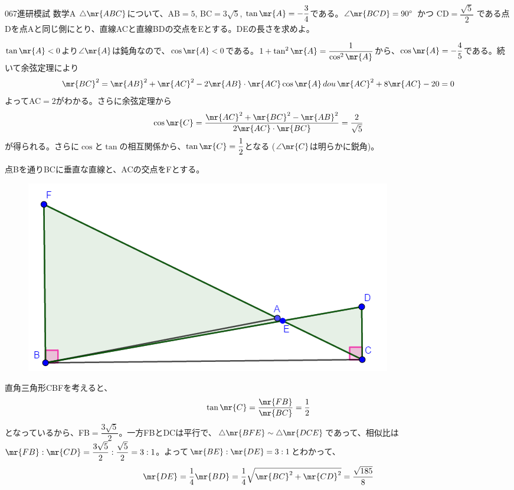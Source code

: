\begin{thm}{067}{}{進研模試 数学A}
 $\triangle\mr{ABC}$について、AB$=5$, BC$=3\sqrt{5}$, $\tan\mr{A}=-\dfrac{3}{4}$である。$\angle\mr{BCD}=90^\circ$ かつ CD$=\dfrac{\sqrt{5}}{2}$ である点Dを点Aと同じ側にとり、直線ACと直線BDの交点をEとする。DEの長さを求めよ。
\end{thm}

$\tan\mr{A}<0$より$\angle\mr{A}$は鈍角なので、$\cos\mr{A}<0$である。$1+\tan^2\mr{A}=\dfrac{1}{\cos^2\mr{A}}$から、$\cos\mr{A}=-\dfrac{4}{5}$である。続いて余弦定理により
\[ \mr{BC}^2=\mr{AB}^2+\mr{AC}^2-2\mr{AB}\cdot\mr{AC}\cos\mr{A} \,dou\, \mr{AC}^2+8\mr{AC}-20=0 \]
よってAC$=2$がわかる。さらに余弦定理から
\[ \cos\mr{C}=\frac{\mr{AC}^2+\mr{BC}^2-\mr{AB}^2}{2\mr{AC}\cdot\mr{BC}} = \frac{2}{\sqrt{5}} \]
が得られる。さらに$\cos$と$\tan$の相互関係から、$\tan\mr{C}=\dfrac{1}{2}$となる ($\angle\mr{C}$は明らかに鋭角)。

点Bを通りBCに垂直な直線と、ACの交点をFとする。
\begin{figure}[H]
 \centering
 \includegraphics[width=0.8\linewidth]{../problems/Q_067/A_067.png}
\end{figure}
直角三角形CBFを考えると、
\[ \tan\mr{C}=\frac{\mr{FB}}{\mr{BC}}=\frac{1}{2} \]
となっているから、FB$=\dfrac{3\sqrt{5}}{2}$。一方FBとDCは平行で、$\triangle\mr{BFE}\sim\triangle\mr{DCE}$であって、相似比は$\mr{FB}:\mr{CD}=\dfrac{3\sqrt{5}}{2}:\dfrac{\sqrt{5}}{2}=3:1$。よって$\mr{BE}:\mr{DE}=3:1$とわかって、
\[ \mr{DE}=\frac{1}{4}\mr{BD}=\frac{1}{4}\sqrt{\mr{BC}^2+\mr{CD}^2}=\frac{\sqrt{185}}{8} \]